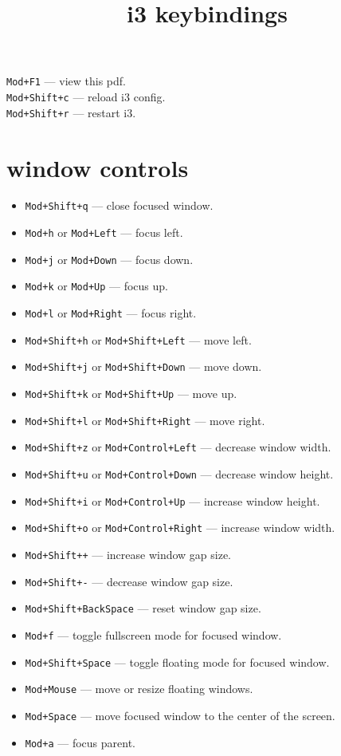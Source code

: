 \documentclass{article}
\title{i3 keybindings}
\author{}
\date{}
\begin{document}
\maketitle

\noindent
\texttt{Mod+F1} --- view this pdf. \\
\texttt{Mod+Shift+c} --- reload i3 config. \\
\texttt{Mod+Shift+r} --- restart i3.

\section*{window controls}

\vspace*{-.5\baselineskip}
\begin{itemize}
	\item \texttt{Mod+Shift+q} --- close focused window.
	\item \texttt{Mod+h} or \texttt{Mod+Left} --- focus left.
	\item \texttt{Mod+j} or \texttt{Mod+Down} --- focus down.
	\item \texttt{Mod+k} or \texttt{Mod+Up} --- focus up.
	\item \texttt{Mod+l} or \texttt{Mod+Right} --- focus right.
	\item \texttt{Mod+Shift+h} or \texttt{Mod+Shift+Left} --- move left.
	\item \texttt{Mod+Shift+j} or \texttt{Mod+Shift+Down} --- move down.
	\item \texttt{Mod+Shift+k} or \texttt{Mod+Shift+Up} --- move up.
	\item \texttt{Mod+Shift+l} or \texttt{Mod+Shift+Right} --- move right.
	\item \texttt{Mod+Shift+z} or \texttt{Mod+Control+Left} --- decrease window width.
	\item \texttt{Mod+Shift+u} or \texttt{Mod+Control+Down} --- decrease window height.
	\item \texttt{Mod+Shift+i} or \texttt{Mod+Control+Up} --- increase window height.
	\item \texttt{Mod+Shift+o} or \texttt{Mod+Control+Right} --- increase window width.
	\item \texttt{Mod+Shift{\small+}+} --- increase window gap size.
	\item \texttt{Mod+Shift{\small+}-} --- decrease window gap size.
	\item \texttt{Mod+Shift+BackSpace} --- reset window gap size.
	\item \texttt{Mod+f} --- toggle fullscreen mode for focused window.
	\item \texttt{Mod+Shift+Space} --- toggle floating mode for focused window.
	\item \texttt{Mod+Mouse} --- move or resize floating windows.
	\item \texttt{Mod+Space} --- move focused window to the center of the screen.
	\item \texttt{Mod+a} --- focus parent.
\end{itemize}
\end{document}
